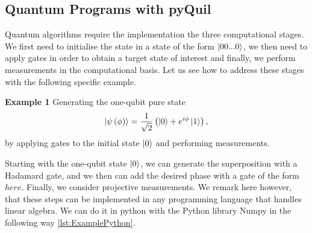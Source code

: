 \begin{comment}

The Rigetti-Forest toolkit \cite{Rigetti2016} for hybrid classical-quantum computing uses the language called Quil. The python library called pyQuil allows us to run simulations in their Quantum Virtual Machine (QVM) which allows the simulation up to 26 qubits, and to run simulations on their Quantum Processor Unit (QPU) which is the physical device called 19Q Acorn which have 20 physical qubits, of which 18 are logical. They recently made available a ~100 pages pyQuil documentation \cite{pyQuilDoc} with examples and exercises to be implemented whether in the QVM or QPU. Access to the QVM can be granted to everyone by registering in their website (they send you an API key right away).

\end{comment}

\subsection*{Quantum Programs with pyQuil} 
\label{Quantum Programs with pyQuil}

Quantum algorithms require the implementation the three computational stages. We first need to initialise the state in a state of the form $\left\vert{00...0}\right\rangle$, we then need to apply gates in order to obtain a target state of interest and finally, we perform measurements in the computational basis. Let us see how to address these stages with the following specific example.

\begin{tcolorbox}[standard jigsaw,
    opacityback=0,  %
    boxrule=0.5pt,label={example1}]
    {\bf Example 1}
    \tcbline
    Generating the one-qubit pure state 
    \begin{align*}
    \left\vert{\psi\left(\phi\right)}\right\rangle=\frac{1}{\sqrt{2}}\left(\left\vert{0}\right\rangle+e^{i\phi}\left\vert{1}\right\rangle\right),
    \end{align*}
    by applying gates to the initial state $\left\vert{0}\right\rangle$ and performing measurements.
\end{tcolorbox}
Starting with the one-qubit state $\left\vert{0}\right\rangle$, we can generate the superposition with a Hadamard gate, and we then can add the desired phase with a gate of the form $here$. Finally, we consider projective measurements. We remark here however, that these steps can be implemented in any programming language that handles linear algebra.  We can do it in python with the Python library Numpy in the following way \autoref{lst:ExamplePython}.

